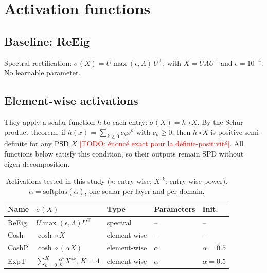 \documentclass[11pt,a4paper]{article}
\newcommand{\todo}[1]{\textcolor{red}{[TODO: #1]}}
\newcommand{\circop}{\circ}
\begin{document}
\section{Activation functions}
\label{sec:activations}

\subsection{Baseline: ReEig}
Spectral rectification: $\sigma(X) = U \max(\epsilon, \Lambda)\, U^\top$, with
$X = U \Lambda U^\top$ and $\epsilon = 10^{-4}$. No learnable parameter.

\subsection{Element-wise activations}
They apply a scalar function $h$ to each entry: $\sigma(X) = h \circop X$.
By the Schur product theorem, if $h(x) = \sum_{k \ge 0} c_k x^k$ with $c_k \ge 0$, then
$h \circop X$ is positive semi-definite for any PSD $X$
\todo{énoncé exact pour la définie-positivité}.
All functions below satisfy this condition, so their outputs remain SPD without
eigen-decomposition.

\begin{table}[h]
\centering
\caption{Activations tested in this study ($\circ$: entry-wise; $X^{\circ k}$: entry-wise power).
$\alpha = \mathrm{softplus}(\tilde\alpha)$, one scalar per layer and per domain.}
\label{tab:activations}
\small
\begin{tabular}{lllll}
\toprule
Name & $\sigma(X)$ & Type & Parameters & Init. \\
\midrule
ReEig & $U \max(\epsilon,\Lambda) U^\top$         & spectral     & --       & -- \\
Cosh  & $\cosh \circ X$                           & element-wise & --       & -- \\
CoshP & $\cosh \circ (\alpha X)$                  & element-wise & $\alpha$ & $\alpha = 0.5$ \\
ExpT  & $\sum_{k=0}^{K} \frac{\alpha^k}{k!} X^{\circ k}$, $K = 4$ & element-wise & $\alpha$ & $\alpha = 0.5$ \\
\bottomrule
\end{tabular}
\end{table}
\end{document}
